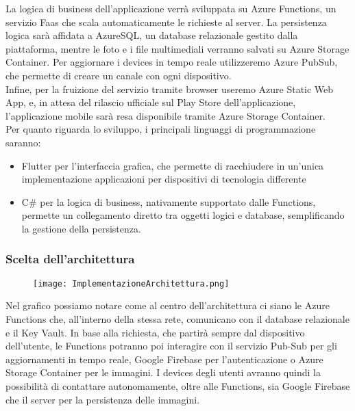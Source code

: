 La logica di business dell'applicazione verrà sviluppata su Azure Functions, un servizio Faas che scala automaticamente le richieste al server.
La persistenza logica sarà affidata a AzureSQL, un database relazionale gestito dalla piattaforma, mentre le foto e i file multimediali verranno salvati su Azure Storage Container.
Per aggiornare i devices in tempo reale utilizzeremo Azure PubSub, che permette di creare un canale con ogni dispositivo.\\
Infine, per la fruizione del servizio tramite browser useremo Azure Static Web App, e, in attesa del rilascio ufficiale sul Play Store dell'applicazione, 
l'applicazione mobile sarà resa disponibile tramite Azure Storage Container.\\
Per quanto riguarda lo sviluppo, i principali linguaggi di programmazione saranno:
\begin{itemize}
    \item Flutter per l'interfaccia grafica, che permette di racchiudere in un'unica implementazione applicazioni per dispositivi di tecnologia differente
    \item C\# per la logica di business, nativamente supportato dalle Functions, permette un collegamento diretto tra oggetti logici e database, semplificando la gestione della persistenza.
\end{itemize}
\pagebreak

\subsubsection{Scelta dell'architettura}
\begin{figure}[h!]
    \begin{center}
        \texttt{[image: ImplementazioneArchitettura.png]}
    \end{center}
\end{figure}
Nel grafico possiamo notare come al centro dell'architettura ci siano le Azure Functions che, all'interno della stessa rete, comunicano con il database relazionale e il Key Vault.
In base alla richiesta, che partirà sempre dal dispositivo dell'utente, le Functions potranno poi interagire con 
il servizio Pub-Sub per gli aggiornamenti in tempo reale, 
Google Firebase per l'autenticazione o 
Azure Storage Container per le immagini.
I devices degli utenti avranno quindi la possibilità di contattare autonomamente, oltre alle Functions, sia Google Firebase che il server per la persistenza delle immagini. 
\clearpage
